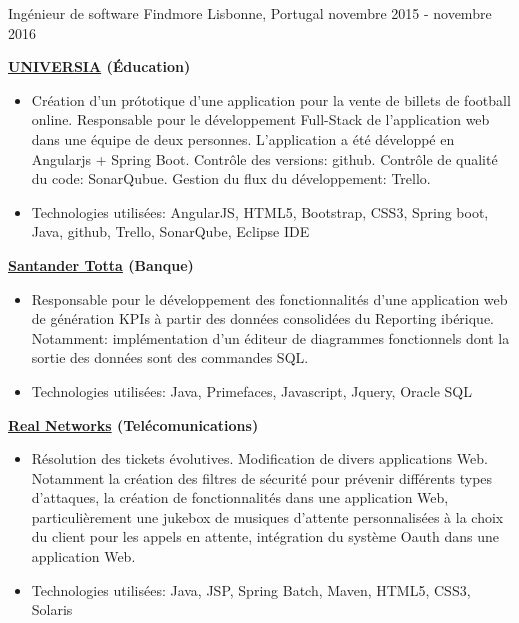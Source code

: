 \begin{cventries}
\cventry
{Ingénieur de software} %
{Findmore} %
{Lisbonne, Portugal} %
{novembre 2015 - novembre 2016} %
{ %
\begin{cvitems}
\item { \textbf{\href{http://www.universia.pt/}{UNIVERSIA} (Éducation)}}
\begin{itemize}
\item {Création d’un prótotique d’une application pour la vente de billets de football online.
Responsable pour le développement Full-Stack de l’application web dans une équipe de deux personnes. L’application a été développé en Angularjs + Spring Boot. Contrôle des versions: github. Contrôle de qualité du code: SonarQubue. Gestion du flux du développement: Trello.}
\item {Technologies utilisées: AngularJS, HTML5, Bootstrap, CSS3, Spring boot, Java, github, Trello, SonarQube, Eclipse IDE}
\end{itemize}
\item { \textbf{\href{https://www.santandertotta.pt/pt_PT/Particulares.html}{Santander Totta} (Banque)}}
\begin{itemize}
\item {Responsable pour le développement des fonctionnalités d’une application web de génération KPIs à partir des données consolidées du Reporting ibérique. Notamment: implémentation d’un éditeur de diagrammes fonctionnels dont la sortie des données sont des commandes SQL.}
\item {Technologies utilisées: Java, Primefaces, Javascript, Jquery, Oracle SQL}
\end{itemize}
\item { \textbf{\href{https://www.realnetworks.com/}{Real Networks} (Telécomunications)}}
\begin{itemize}
\item {Résolution des tickets évolutives. Modification de divers applications Web. Notamment la création des filtres de sécurité pour prévenir différents types d'attaques, la création de fonctionnalités dans une application Web, particulièrement une jukebox de musiques d'attente personnalisées à la choix du client pour les appels en attente, intégration du système Oauth dans une application Web.}
\item {Technologies utilisées: Java, JSP, Spring Batch, Maven, HTML5, CSS3,  Solaris}
\end{itemize}
\end{cvitems}
}


\end{cventries}
